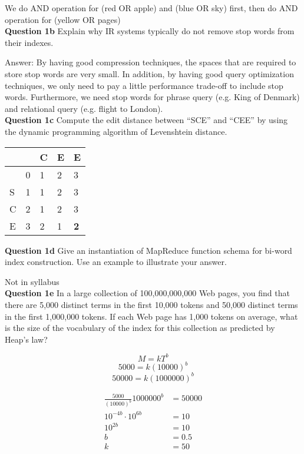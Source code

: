 \documentclass[11pt,a4paper]{report}
\begin{document}
\begin{multicols*}{2}
\noindent We do AND operation for (red OR apple) and (blue OR sky) first, then do AND operation for (yellow OR pages)\\

\noindent \textbf{Question 1b} Explain why IR systems typically do not remove stop words from their indexes. 

\noindent Answer: By having good compression techniques, the spaces that are required to store stop words are very small. In addition, by having good query optimization techniques, we only need to pay a little performance trade-off to include stop words. Furthermore, we need stop words for phrase query (e.g. King of Denmark) and relational query (e.g. flight to London). \\

\noindent \textbf{Question 1c} Compute the edit distance between ``SCE'' and ``CEE'' by using the dynamic programming algorithm of Levenshtein distance. 

\begin{center}
\begin{tabular}{ | l | l  l  l  l  |} 
    \hline
      &   & C & E & E \\
    \hline
      & 0 & 1 & 2 & 3 \\
    S & 1 & 1 & 2 & 3 \\
    C & 2 & 1 & 2 & 3 \\
    E & 3 & 2 & 1 & \textbf{2} \\
    \hline
\end{tabular}
\end{center}

\noindent \textbf{Question 1d} Give an instantiation of MapReduce function schema for bi-word index construction. Use an example to illustrate your answer.

\noindent Not in syllabus\\

\noindent \textbf{Question 1e} In a large collection of 100,000,000,000 Web pages, you find that there are 5,000 distinct terms in the first 10,000 tokens and 50,000 distinct terms in the first 1,000,000 tokens. If each Web page has 1,000 tokens on average, what is the size of the vocabulary of the index for this collection as predicted by Heap's law?

$$M=kT^b$$
$$5000=k(10000)^b$$
$$50000=k(1000000)^b$$

\begin{equation*}
\begin{split}
    \frac{5000}{(10000)^b}1000000^b &= 50000 \\
    10^{-4b}\cdot 10^{6b} &= 10 \\
    10^{2b} &= 10\\
    b &= 0.5\\
    k &= 50
\end{split}
\end{equation*}


\end{multicols*}
\end{document}
